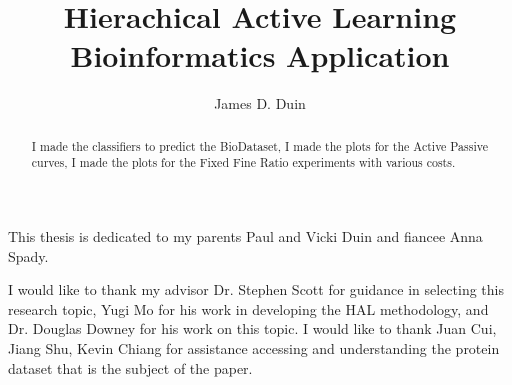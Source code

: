 \documentclass[ms]{nuthesis}
\begin{document}
\frontmatter

\title{Hierachical Active Learning Bioinformatics Application}
\author{James D. Duin}
\maketitle
\begin{abstract}
  \par I made the classifiers to predict the BioDataset, I made the
  plots for the Active Passive curves, I made the plots for the Fixed
  Fine Ratio experiments with various costs.
\end{abstract}


\begin{dedication}
  This thesis is dedicated to my parents Paul and Vicki Duin and fiancee Anna Spady.
\end{dedication}

\begin{acknowledgments}
  I would like to thank my advisor Dr. Stephen Scott for guidance in selecting this
  research topic, Yugi Mo for his work in developing the HAL methodology, and Dr.
  Douglas Downey for his work on this topic. I would like to thank Juan Cui, Jiang Shu,
  Kevin Chiang for assistance accessing and understanding the protein dataset that is
  the subject of the paper.
\end{acknowledgments}
\end{document}
